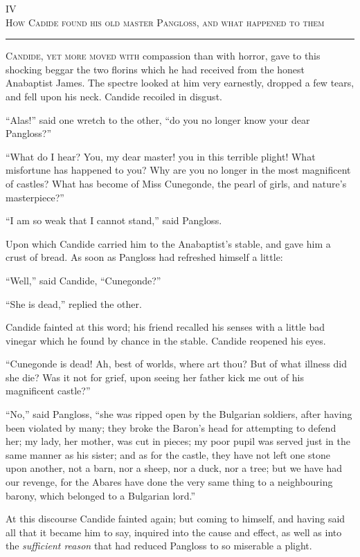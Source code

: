 \begin{center}
IV\\
\textsc{How Cadide found his old master Pangloss, and what happened to them}
\end{center}
\vspace{-0.5cm}
\rule{\textwidth}{0.5pt}
\lettrine{C}{andide, yet more moved with} compassion than with horror, gave to this shocking beggar the two florins which he had received from the honest Anabaptist James. The spectre looked at him very earnestly, dropped a few tears, and fell upon his neck. Candide recoiled in disgust.

``Alas!'' said one wretch to the other, ``do you no longer know your dear Pangloss?''

``What do I hear? You, my dear master! you in this terrible plight! What misfortune has happened to you? Why are you no longer in the most magnificent of castles? What has become of Miss Cunegonde, the pearl of girls, and nature's masterpiece?''

``I am so weak that I cannot stand,'' said Pangloss.

Upon which Candide carried him to the Anabaptist's stable, and gave him a crust of bread. As soon as Pangloss had refreshed himself a little:

``Well,'' said Candide, ``Cunegonde?''

``She is dead,'' replied the other.

Candide fainted at this word; his friend recalled his senses with a little bad vinegar which he found by chance in the stable. Candide reopened his eyes.

``Cunegonde is dead! Ah, best of worlds, where art thou? But of what illness did she die? Was it not for grief, upon seeing her father kick me out of his magnificent castle?''

``No,'' said Pangloss, ``she was ripped open by the Bulgarian soldiers, after having been violated by many; they broke the Baron's head for attempting to defend her; my lady, her mother, was cut in pieces; my poor pupil was served just in the same manner as his sister; and as for the castle, they have not left one stone upon another, not a barn, nor a sheep, nor a duck, nor a tree; but we have had our revenge, for the Abares have done the very same thing to a neighbouring barony, which belonged to a Bulgarian lord.''

At this discourse Candide fainted again; but coming to himself, and having said all that it became him to say, inquired into the cause and effect, as well as into the \textit{sufficient reason} that had reduced Pangloss to so miserable a plight.

